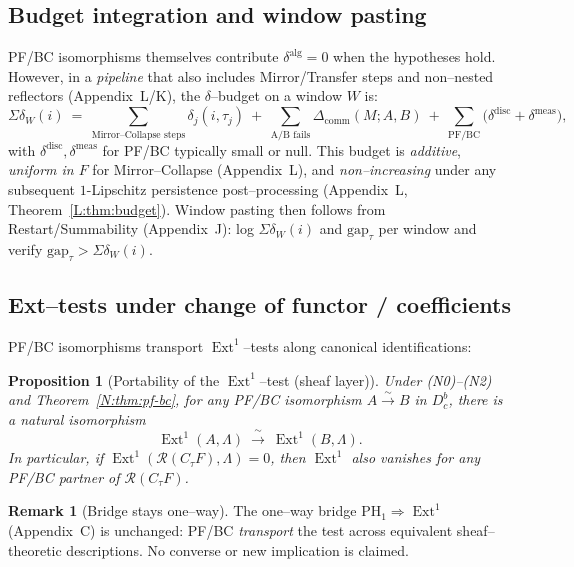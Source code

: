 \documentclass[11pt]{article}
\DeclareMathOperator{\Ext}{Ext}
\DeclareRobustCommand{\hyp}{\nobreakdash-}
\numberwithin{equation}{section}
\newtheorem{proposition}[theorem]{Proposition}
\theoremstyle{definition}
\newtheorem{remark}[theorem]{Remark}
\begin{document}
\subsection{Budget integration and window pasting}
\label{N:budget}
PF/BC isomorphisms themselves contribute \(\delta^{\mathrm{alg}}=0\) when the hypotheses hold. However, in a \emph{pipeline} that also includes Mirror/Transfer steps and non–nested reflectors (Appendix~L/K), the \(\delta\)–budget on a window \(W\) is:
\[
\Sigma\delta_W(i)\ =\ \sum_{\text{Mirror--Collapse steps}} \delta_j(i,\tau_j)\ +\ \sum_{\text{A/B fails}} \Delta_{\mathrm{comm}}(M;A,B)\ +\ \sum_{\text{PF/BC}} \big(\delta^{\mathrm{disc}}+\delta^{\mathrm{meas}}\big),
\]
with \(\delta^{\mathrm{disc}},\delta^{\mathrm{meas}}\) for PF/BC typically small or null. This budget is \emph{additive}, \emph{uniform in \(F\)} for Mirror–Collapse (Appendix~L), and \emph{non–increasing} under any subsequent \(1\)\hyp Lipschitz persistence post–processing (Appendix~L, Theorem~\ref{L:thm:budget}). Window pasting then follows from Restart/Summability (Appendix~J): log \(\Sigma\delta_W(i)\) and \(\mathrm{gap}_\tau\) per window and verify \(\mathrm{gap}_\tau>\Sigma\delta_W(i)\).

\subsection{Ext–tests under change of functor / coefficients}
\label{N:ext-tests}
PF/BC isomorphisms transport \(\Ext^1\)–tests along canonical identifications:

\begin{proposition}[Portability of the \(\Ext^1\)–test \textup{(sheaf layer)}]
Under \textup{(N0)–(N2)} and Theorem~\ref{N:thm:pf-bc}, for any PF/BC isomorphism \(A \xrightarrow{\sim} B\) in \(D^{b}_{c}\), there is a natural isomorphism
\[
\Ext^1(A,\Lambda)\ \xrightarrow{\ \sim\ }\ \Ext^1(B,\Lambda).
\]
In particular, if \(\Ext^1(\mathcal{R}(C_\tau F),\Lambda)=0\), then \(\Ext^1\) also vanishes for any PF/BC partner of \(\mathcal{R}(C_\tau F)\).
\end{proposition}

\begin{remark}[Bridge stays one–way]
The one–way bridge \(\mathrm{PH}_1\Rightarrow \Ext^1\) (Appendix~C) is unchanged: PF/BC \emph{transport} the test across equivalent sheaf–theoretic descriptions. No converse or new implication is claimed.
\end{remark}
\end{document}
